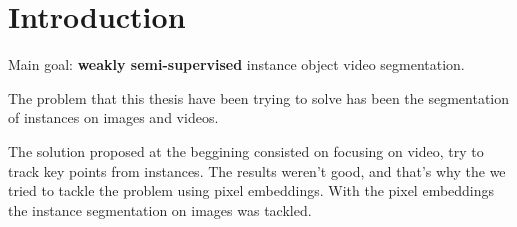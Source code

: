 
%


\chapter{Introduction}
\label{cha:introduction}

Main goal: \textbf{weakly semi-supervised} instance object video segmentation.





The problem that this thesis have been trying to solve has been the segmentation of instances on images and videos.

The solution proposed at the beggining consisted on focusing on video, try to track key points from instances.
The results weren't good, and that's why the we tried to tackle the problem using pixel embeddings.
With the pixel embeddings the instance segmentation on images was tackled.


